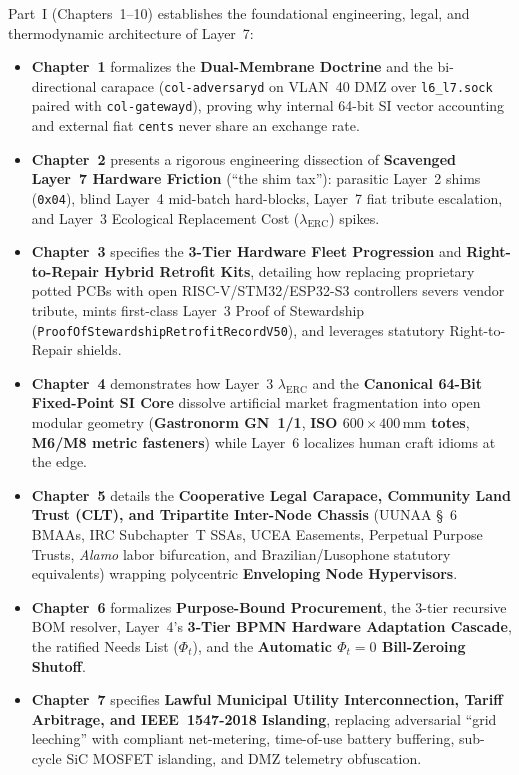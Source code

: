 Part~I (Chapters~1--10) establishes the foundational engineering, legal, and thermodynamic architecture of Layer~7:
\begin{itemize}
    \item \textbf{Chapter~1} formalizes the \textbf{Dual-Membrane Doctrine} and the bi-directional carapace (\texttt{col-adversaryd} on VLAN~40 DMZ over \texttt{l6\_l7.sock} paired with \texttt{col-gatewayd}), proving why internal 64-bit SI vector accounting and external fiat \texttt{cents} never share an exchange rate.
    \item \textbf{Chapter~2} presents a rigorous engineering dissection of \textbf{Scavenged Layer~7 Hardware Friction} (``the shim tax''): parasitic Layer~2 shims (\texttt{0x04}), blind Layer~4 mid-batch hard-blocks, Layer~7 fiat tribute escalation, and Layer~3 Ecological Replacement Cost ($\lambda_{\mathrm{ERC}}$) spikes.
    \item \textbf{Chapter~3} specifies the \textbf{3-Tier Hardware Fleet Progression} and \textbf{Right-to-Repair Hybrid Retrofit Kits}, detailing how replacing proprietary potted PCBs with open RISC-V/STM32/ESP32-S3 controllers severs vendor tribute, mints first-class Layer~3 Proof of Stewardship (\texttt{ProofOfStewardshipRetrofitRecordV50}), and leverages statutory Right-to-Repair shields.
    \item \textbf{Chapter~4} demonstrates how Layer~3 $\lambda_{\mathrm{ERC}}$ and the \textbf{Canonical 64-Bit Fixed-Point SI Core} dissolve artificial market fragmentation into open modular geometry (\textbf{Gastronorm GN~1/1}, \textbf{ISO $600 \times 400\,\mathrm{mm}$ totes}, \textbf{M6/M8 metric fasteners}) while Layer~6 localizes human craft idioms at the edge.
    \item \textbf{Chapter~5} details the \textbf{Cooperative Legal Carapace, Community Land Trust (CLT), and Tripartite Inter-Node Chassis} (UUNAA \S~6 BMAAs, IRC Subchapter~T SSAs, UCEA Easements, Perpetual Purpose Trusts, \textit{Alamo} labor bifurcation, and Brazilian/Lusophone statutory equivalents) wrapping polycentric \textbf{Enveloping Node Hypervisors}.
    \item \textbf{Chapter~6} formalizes \textbf{Purpose-Bound Procurement}, the 3-tier recursive BOM resolver, Layer~4's \textbf{3-Tier BPMN Hardware Adaptation Cascade}, the ratified Needs List ($\Phi_t$), and the \textbf{Automatic $\Phi_t = 0$ Bill-Zeroing Shutoff}.
    \item \textbf{Chapter~7} specifies \textbf{Lawful Municipal Utility Interconnection, Tariff Arbitrage, and IEEE~1547-2018 Islanding}, replacing adversarial ``grid leeching'' with compliant net-metering, time-of-use battery buffering, sub-cycle SiC MOSFET islanding, and DMZ telemetry obfuscation.

\end{itemize}
